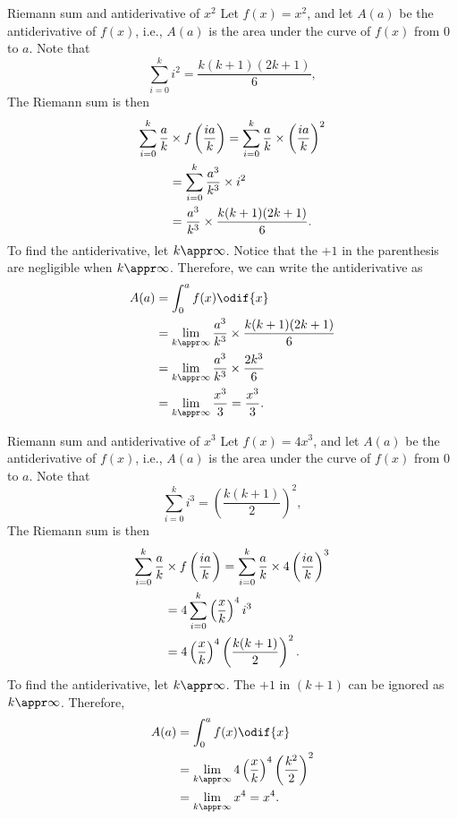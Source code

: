 \begin{exmp}{Riemann sum and antiderivative of $x^2$}{}
	Let $f(x) = x^2$, and let $A(a)$ be the antiderivative of $f(x)$, i.e., $A(a)$ is the area under the curve of $f(x)$ from $0$ to $a$. Note that
	\begin{equation}
		\sum_{i = 0}^{k}i^2 = \frac{k(k + 1)(2k + 1)}{6},
	\end{equation}
	The Riemann sum is then
	\begin{align}
		\sum_{i = 0}^{k}\frac{a}{k} & \times f\left( i a \over k \right) = \sum_{i = 0}^k\frac{a}{k}\times \left(ia\over k\right)^2 \\
		                            & = \sum_{i = 0}^k\frac{a^3}{k^3}\times i^2                                                     \\
		                            & = \frac{a^3}{k^3}\times \frac{k(k + 1)(2k + 1)}{6}.
	\end{align}
	To find the antiderivative, let $k \appr \infty$. Notice that the $+1$ in the parenthesis are negligible when $k \appr \infty$. Therefore, we can write the antiderivative as
	\begin{align}
		A(a) & = \int_0^a f(x)\odif{x}                                                 \\
		     & = \lim_{k \appr \infty}\frac{a^3}{k^3}\times \frac{k(k + 1)(2k + 1)}{6} \\
		     & = \lim_{k \appr \infty}\frac{a^3}{k^3}\times \frac{2k^3}{6}             \\
		     & = \lim_{k \appr \infty}\frac{x^3}{3} = \frac{x^3}{3}.
	\end{align}
\end{exmp}

\begin{exmp}{Riemann sum and antiderivative of $x^3$}{}
	Let $f(x) = 4x^3$, and let $A(a)$ be the antiderivative of $f(x)$, i.e., $A(a)$ is the area under the curve of $f(x)$ from $0$ to $a$. Note that
	\begin{equation}
		\sum_{i = 0}^{k}i^3 = \left(\frac{k(k + 1)}{2}\right)^2,
	\end{equation}
	The Riemann sum is then
	\begin{align*}
		\sum_{i = 0}^{k}\frac{a}{k} & \times f\left( i a \over k \right) = \sum_{i = 0}^k\frac{a}{k}\times 4\left(ia\over k\right)^3 \\
		                            & = 4\sum_{i = 0}^k \left(\frac{x}{k}\right)^4 i^3                                               \\
		                            & = 4\left(\frac{x}{k}\right)^4\left(k(k+1)\over 2\right)^2.
	\end{align*}
	To find the antiderivative, let $k \appr \infty$. The $+1$ in $(k + 1)$ can be ignored as $k \appr \infty$. Therefore,
	\begin{align*}
		A(a) & = \int_0^a f(x)\odif{x}                                                \\
		     & = \lim_{k\appr\infty}4\left(x\over k\right)^4\left(k^2\over 2\right)^2 \\
		     & = \lim_{k\appr\infty}x^4 = x^4.
	\end{align*}
\end{exmp}


